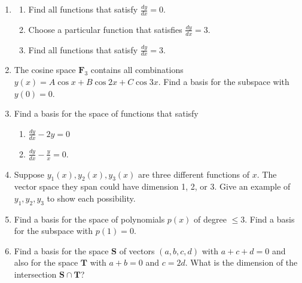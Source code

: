 \documentclass[14pt, a4paper]{article}
\begin{document}
\begin{enumerate}[resume]
    \item \begin{enumerate}
              \item Find all functions that satisfy $\frac{dy}{dx} = 0$.
              \item Choose a particular function that satisfies $\frac{dy}{dx} = 3$.
              \item Find all functions that satisfy $\frac{dy}{dx} = 3$.
          \end{enumerate}

    \item The cosine space $\mathbf{F}_3$ contains all combinations $y(x) = A \cos x + B \cos 2x + C \cos 3x$. Find a basis for the subspace with $y(0) = 0$.

    \item Find a basis for the space of functions that satisfy
          \begin{enumerate}
              \item $\frac{dy}{dx} - 2y = 0$
              \item $\frac{dy}{dx} - \frac{y}{x} = 0$.
          \end{enumerate}

    \item Suppose $y_1(x), y_2(x), y_3(x)$ are three different functions of $x$. The vector space they span could have dimension 1, 2, or 3. Give an example of $y_1, y_2, y_3$ to show each possibility.

    \item Find a basis for the space of polynomials $p(x)$ of degree $\le 3$. Find a basis for the subspace with $p(1) = 0$.

    \item Find a basis for the space $\mathbf{S}$ of vectors $(a, b, c, d)$ with $a + c + d = 0$ and also for the space $\mathbf{T}$ with $a + b = 0$ and $c = 2d$. What is the dimension of the intersection $\mathbf{S} \cap \mathbf{T}$?


\end{enumerate}
\end{document}
